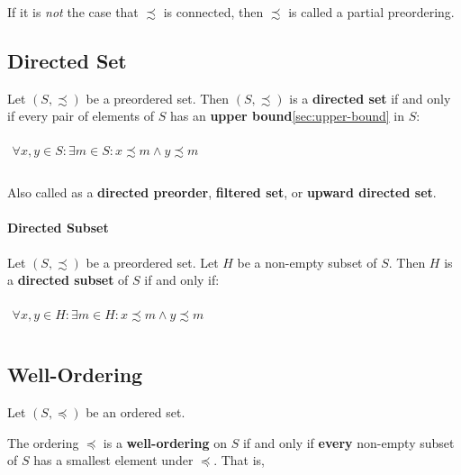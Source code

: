 If it is \textit{not} the case that $\precsim$ is connected, then
$\precsim$ is called a partial preordering.


\subsection{Directed Set}
\label{sec:directed-set}

Let $(S, \precsim)$ be a preordered set. Then $(S, \precsim)$ is a
\textbf{directed set} if and only if every pair of elements of $S$ has
an \textbf{upper bound}\ref{sec:upper-bound} in $S$:

\begin{math}
  \begin{array}{c}
    \\
    \forall x, y \in S: \exists m \in S: x \precsim m \land y \precsim m \\
    \\
  \end{array}
\end{math}

Also called as a \textbf{directed preorder}, \textbf{filtered set}, or
\textbf{upward directed set}.

\paragraph{Directed Subset}
\label{sec:directed-subset}

Let $(S, \precsim)$ be a preordered set. Let $H$ be a non-empty subset
of $S$. Then $H$ is a \textbf{directed subset} of $S$ if and only if:

\begin{math}
  \begin{array}{c}
    \\
    \forall x, y \in H: \exists m \in H: x \precsim m \land y \precsim m\\
    \\
  \end{array}
\end{math}



\subsection{Well-Ordering}
\label{sec:well-ordering}

Let $(S, \preceq)$ be an ordered set.

The ordering $\preceq$ is a \textbf{well-ordering} on $S$ if and only
if \textbf{every} non-empty subset of $S$ has a smallest element under
$\preceq$. That is,


